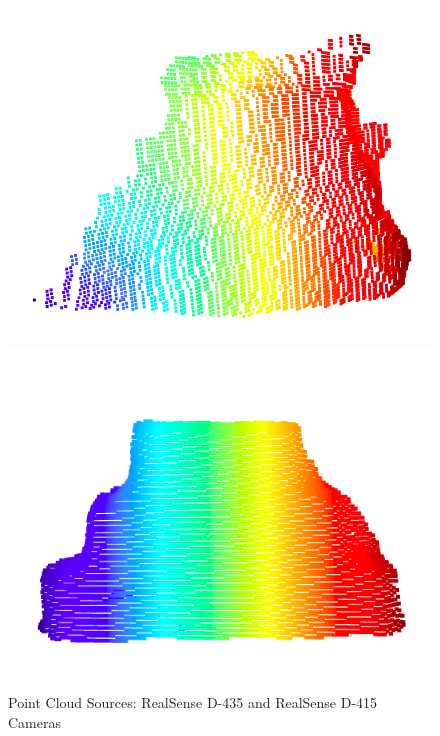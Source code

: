 \begin{figure}[htp]
\begin{center}
{
  \includegraphics[clip,width=0.6\columnwidth]{images/real_cloud.png}
}
\end{center}
\begin{center}
{
  \includegraphics[clip,width=0.6\columnwidth]{images/realnew_cloud.png}
}
\end{center}
\caption{Point Cloud Sources: RealSense D-435 and RealSense D-415 Cameras}
\label{realnewreal}
\end{figure}


